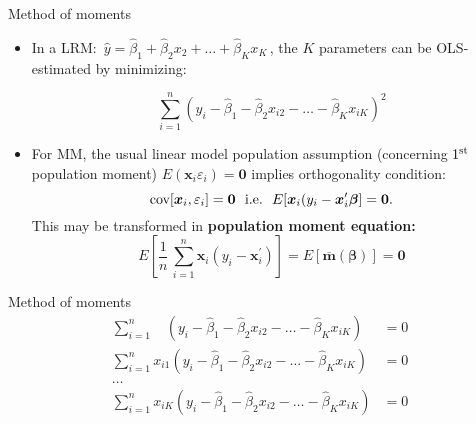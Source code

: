 \documentclass{beamer}
\begin{document}
\begin{frame}{Method of moments}
\footnotesize
\begin{itemize}
\item In a LRM: $\, \hat{y} = \hat{\beta}_1 + \hat{\beta}_2 x_{2} + \dots + \hat{\beta}_K x_{K} \,$, the $K$ parameters can be OLS-estimated by minimizing:

\begin{equation*}
\sum_{i=1}^n \left( y_i - \hat{\beta}_1 - \hat{\beta}_2 x_{i2} - \dots - \hat{\beta}_K x_{iK} \right)^2
\end{equation*}
\item For MM, the usual linear model population assumption (concerning $1^{\textnormal{st}}$ population moment) $E(\bm{x}_i \varepsilon_i)=\bm{0}$ implies orthogonality condition: $$\textnormal{cov}[\bm{x}_i, \varepsilon_i] = \bm{0} \textnormal{~~i.e.~~}E[\bm{x}_i(y_i-\bm{x}_i^{\prime}\bm{\beta}]=\bm{0}.$$ 
This may be transformed in \textbf{population moment equation:}
$$
E \left[ \frac{1}{n} \, \sum_{i=1}^n \bm{x}_i (y_i - \bm{x}_i^{\prime}) \right] 
= E \left[ \overline{\bm{m}}(\bm{\beta}) \right] = \bm{0}
$$
\end{itemize}
\end{frame}
\begin{frame}{Method of moments}
\footnotesize{
\begin{equation*}
\begin{aligned}
\sum_{i=1}^n ~~~~\left( y_i - \hat{\beta}_1 - \hat{\beta}_2 x_{i2} - \dots - \hat{\beta}_K x_{iK} \right) &= 0\\
\sum_{i=1}^n  x_{i1} \left( y_i - \hat{\beta}_1 - \hat{\beta}_2 x_{i2} - \dots - \hat{\beta}_K x_{iK} \right) &= 0\\
\dots &\\
\sum_{i=1}^n x_{iK} \left( y_i - \hat{\beta}_1 - \hat{\beta}_2 x_{i2} - \dots - \hat{\beta}_K x_{iK} \right) &= 0\\
\end{aligned}
\end{equation*}
} %
\end{frame}
\end{document}
